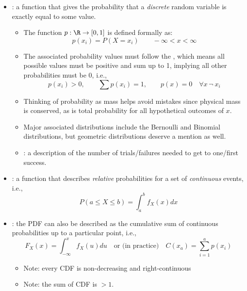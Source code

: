 \begin{itemize}
\begin{itemize}
    \item {}: a function that gives the probability that a \emph{discrete} random variable  is exactly equal to some value. 
    \begin{itemize}
      \item The function \(p:\R \rightarrow [0,1]\) is defined formally as:
      \[%
      p(x_i)=P(X=x_i) \qquad -\infty<x<\infty
      \]%
      \item The associated probability values must follow the \hyperref[Subsection: Probability Theory Axioms]{}, which means all possible values must be positive and sum up to 1, implying all other probabilities must be 0, i.e., 
      \[%
      p(x_i) > 0,\qquad
      \sum p(x_i)=1,\qquad
      p(x) = 0 \quad \forall x \,\neg ~x_i
      \]%
      \item Thinking of probability as mass helps avoid mistakes since physical mass is conserved, as is total probability for all hypothetical outcomes of \(x\).
      \item Major associated distributions include the  \hyperref[Subsection: Primer: Probability Distributions]{} Bernoulli and Binomial distributions, but geometric distributions deserve a mention as well. 
      \item {}: a description of the number of trials/failures needed to get to one/first success.
    \end{itemize}
    \item {}: a function that describes \emph{relative} probabilities for a set of \hyperref[Subsection: Independent and Mutually Exclusive Events]{} \emph{continuous} events, i.e.,
    \[%
    P(a\leq X \leq b) = \int_a^b f_X(x)dx
    \]%
    \item {}: the PDF can also be described as the cumulative sum of continuous probabilities up to a particular point, i.e., 
    \[%
    F_X(x) = \int_{-\infty}^x f_X(u)du \quad \text{or (in practice)}\quad
    C(x_a) = \sum_{i = 1}^{a} p(x_i)
    \]%
    \begin{itemize}
      \item Note: every CDF is non-decreasing and right-continuous 
      \item Note: the sum of CDF is \(> 1\).
    \end{itemize}
  \end{itemize}
\end{itemize}

